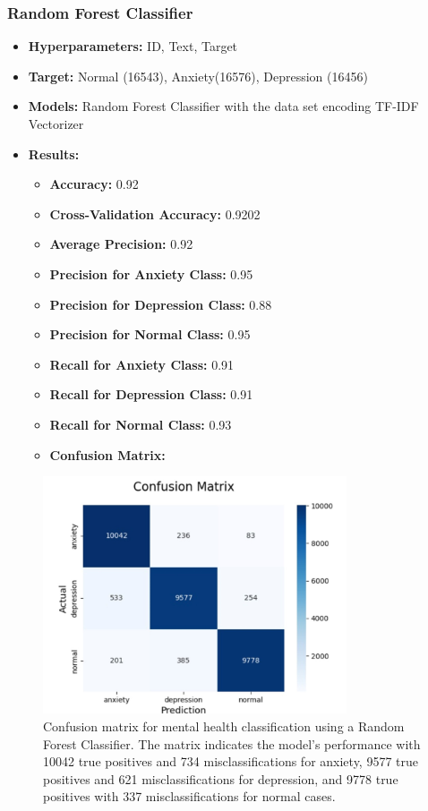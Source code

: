 \documentclass[runningheads,a4paper,11pt]{report}
\begin{document}
\subsubsection{Random Forest Classifier}
\begin{itemize}
    \item \textbf{Hyperparameters:} ID, Text, Target
    \item \textbf{Target:} Normal (16543), Anxiety(16576), Depression (16456)
    \item \textbf{Models:} Random Forest Classifier with the data set encoding TF-IDF Vectorizer
    \item \textbf{Results:}
    \begin{itemize}
        \item \textbf{Accuracy:} 0.92 
        \item \textbf{Cross-Validation Accuracy:} 0.9202
        \item \textbf{Average Precision:} 0.92
        \item \textbf{Precision for Anxiety Class:} 0.95
        \item \textbf{Precision for Depression Class:} 0.88
        \item \textbf{Precision for Normal Class:} 0.95
        \item \textbf{Recall for Anxiety Class:} 0.91
        \item \textbf{Recall for Depression Class:} 0.91
        \item \textbf{Recall for Normal Class:} 0.93
        \item \textbf{Confusion Matrix:}
    \end{itemize}
\end{itemize}

\begin{figure}[H]
\centering
\includegraphics[width=0.8\textwidth]{Multi-Class-Data.jpg}
\caption[Confusion matrix for mental health classification (Random Forest Classifier)]{Confusion matrix for mental health classification using a Random Forest Classifier. The matrix indicates the model's performance with 10042 true positives and 734 misclassifications for anxiety, 9577 true positives and 621 misclassifications for depression, and 9778 true positives with 337 misclassifications for normal cases.}
\label{fig:confusion_matrix_rf}
\end{figure}
\clearpage
\end{document}
